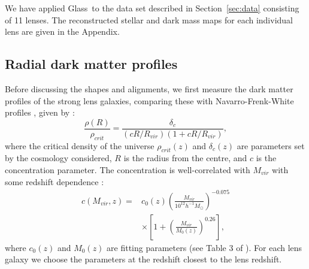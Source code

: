 \documentclass[useAMS,usenatbib]{mn2e}
\def\Glass{{\sc Glass}}
\begin{document}
We have applied \Glass\ to the data set described in Section~\ref{sec:data} consisting of 11 lenses. The reconstructed stellar and dark mass maps for each individual lens are given in the Appendix.

\subsection{Radial dark matter profiles}\label{sec:radialprofiles}
Before discussing the shapes and alignments, we first measure the dark matter profiles of the strong lens galaxies, comparing these with Navarro-Frenk-White profiles \citep[NFW;][]{1996ApJ...462..563N}, given by \citep{2011ApJ...740..102K}:
\begin{equation}\label{eq:nfw}
   \frac{\rho(R)}{\rho_{crit}} = \frac{\delta_{c}}{(cR/R_{vir})(1+cR/R_{vir})},
\end{equation}
where the critical density of the universe $\rho_{crit}(z)$ and $\delta_{c}(z)$ are parameters set by the cosmology considered, $R$ is the radius from the centre, and $c$ is the concentration parameter. The concentration is well-correlated with $M_{vir}$ with some redshift dependence \citep{2011ApJ...740..102K}: 
\begin{equation}\label{eq:concentration}
 \begin{split}
   c(M_{vir}, z) = & c_{0}(z)\left(\frac{M_{vir}}{10^{12}h^{-1}M_{\odot}}\right)^{-0.075} \\ & \times \left[1+\left(\frac{M_{vir}}{M_{0}(z)}\right)^{0.26}\right],
 \end{split}
\end{equation}
where $c_{0}(z)$ and $M_{0}(z)$ are fitting parameters (see Table 3 of \citet{2011ApJ...740..102K}). For each lens galaxy we choose the parameters at the redshift closest to the lens redshift.
\end{document}
